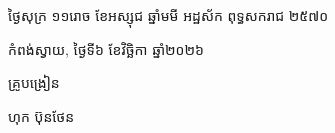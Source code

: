 \documentclass[a4paper,10pt]{article}
\begin{document}
\vspace{6pt}
{\centering
\hspace*{5.2cm}\begin{minipage}{11.5cm}
  \centering
  ថ្ងៃសុក្រ ១១រោច ខែអស្សុជ ឆ្នាំមមី អដ្ឋស័ក ពុទ្ធសករាជ ២៥៧០\par
  កំពង់ស្វាយ, ថ្ងៃទី៦ ខែវិច្ឆិកា ឆ្នាំ២០២៦\par
  \vspace{2pt}
  {\muol គ្រូបង្រៀន\par}
  \vspace{32pt}
  \hfill{\muol ហុក ប៊ុនថែន}\hspace*{1.4cm}
\end{minipage}\par}
\end{document}
